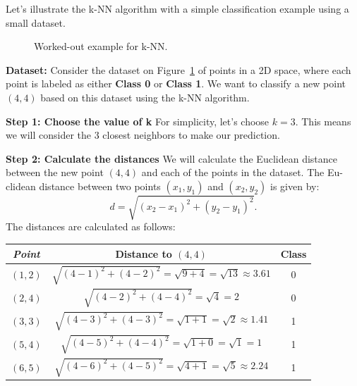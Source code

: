 Let's illustrate the k-NN algorithm with a simple classification example using
a small dataset.

\begin{figure}[h]\centering
\caption{Worked-out example for k-NN.}\label{fig:ch3-worked-out}
\end{figure}

\textbf{Dataset:} Consider the dataset on Figure~\ref{fig:ch3-worked-out} of points in a 2D space, where
each point is labeled as either \textbf{Class 0} or \textbf{Class 1}. We want to classify a new
point $(4, 4)$ based on this dataset using the k-NN algorithm.

\textbf{Step 1: Choose the value of k} For simplicity, let's choose $k = 3$. This
means we will consider the 3 closest neighbors to make our prediction.

\textbf{Step 2: Calculate the distances} We will calculate the Euclidean distance
between the new point $(4, 4)$ and each of the points in the dataset. The Eu-
clidean distance between two points $(x_1, y_1)$ and $(x_2, y_2)$ is given by:
\begin{equation}\label{eq:ch3-euclidean}
d = \sqrt{(x_2 - x_1)^2 + (y_2 - y_1)^2}.
\end{equation}
The distances are calculated as follows:

\begin{center}
\begin{tabular}{c|c|c}
\toprule
\textit{Point} & Distance to $(4,4)$ & Class \\
\midrule
$(1,2)$ & $\sqrt{(4-1)^2 + (4-2)^2} = \sqrt{9+4} = \sqrt{13} \approx 3.61$ & 0 \\
$(2,4)$ & $\sqrt{(4-2)^2 + (4-4)^2} = \sqrt{4} = 2$ & 0 \\
$(3,3)$ & $\sqrt{(4-3)^2 + (4-3)^2} = \sqrt{1+1} = \sqrt{2} \approx 1.41$ & 1 \\
$(5,4)$ & $\sqrt{(4-5)^2 + (4-4)^2} = \sqrt{1+0} = \sqrt{1} = 1$ & 1 \\
$(6,5)$ & $\sqrt{(4-6)^2 + (4-5)^2} = \sqrt{4+1} = \sqrt{5} \approx 2.24$ & 1 \\
\bottomrule
\end{tabular}
\end{center}

